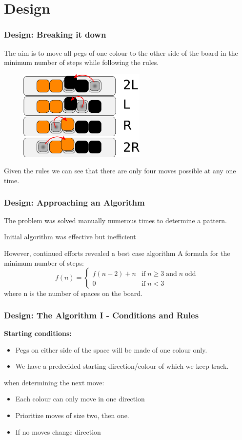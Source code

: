 \documentclass{beamer}
\begin{document}
\section{Design}
	\begin{frame}
		\frametitle{Design: Breaking it down}
		The aim is to move all pegs of one colour to the other side of the board in the minimum number of steps
		while following the rules.
		
		\begin{figure}
		\includegraphics[height=4.5cm]{pegboardmoves}
		\end{figure}
		
		Given the rules we can see that there are only four moves possible at any one time. 
		
		
	\end{frame}
	
	\begin{frame}
		\frametitle{Design: Approaching an Algorithm}
		The problem was solved manually numerous times to determine a pattern.
		\blt
			\item Initial algorithm was effective but inefficient
			\item However, continued efforts revealed a best case algorithm
		\finblt
		\vfill
		A formula for the minimum number of steps:
		\[
		f(n) = 
			\begin{cases} 
				f(n - 2) + n & \textrm{if}\; n \geq 3 \;\textrm{and}\; n \;\textrm{odd}\\
				0 & \textrm{if}\; n < 3
		 	\end{cases}
		\]
		where n is the number of spaces on the board.		
		
	\end{frame}
	
	\begin{frame}
		\frametitle{Design: The Algorithm I - Conditions and Rules}
		\textbf{Starting conditions:} 
		\begin{itemize}
		\item Pegs on either side of the space will be made of one colour only. 
		\item We have a predecided starting direction/colour of which we keep track. 
		\end{itemize}
		\vfill
		 when determining the next move:
		\begin{itemize}
			\item Each colour can only move in one direction
			\item Prioritize moves of size two, then one. 
			\item If no moves change direction
		\end{itemize}
		
	\end{frame}
	
\end{document}
